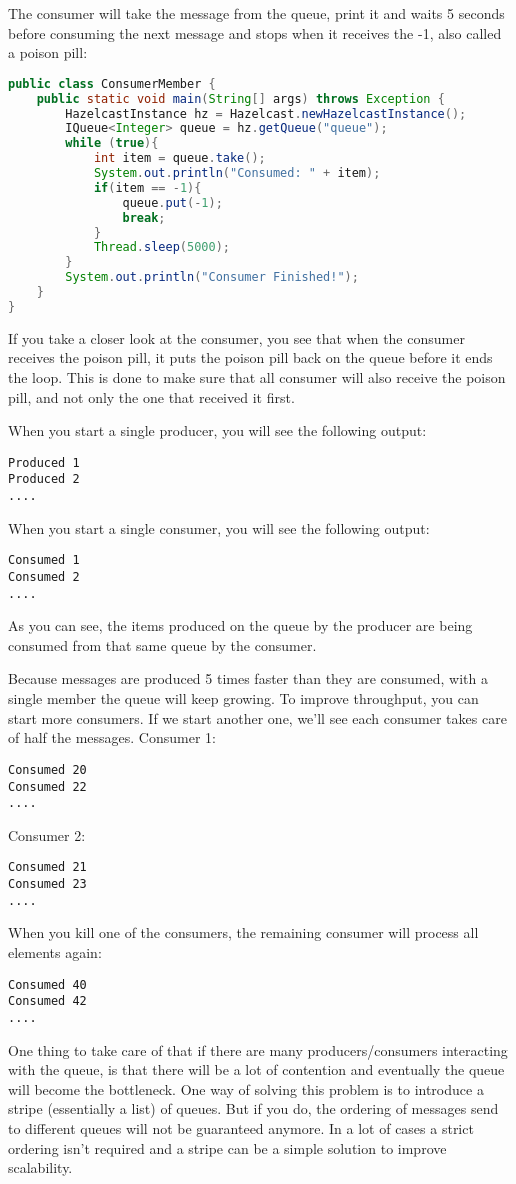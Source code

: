 The consumer will take the message from the queue, print it and waits 5 seconds before consuming the next message and stops when it receives the -1, also called a poison pill:
\begin{lstlisting}[language=java]
public class ConsumerMember {
    public static void main(String[] args) throws Exception {
        HazelcastInstance hz = Hazelcast.newHazelcastInstance();
        IQueue<Integer> queue = hz.getQueue("queue");
        while (true){
            int item = queue.take();
            System.out.println("Consumed: " + item);
            if(item == -1){
                queue.put(-1);
                break;
            }     
            Thread.sleep(5000);
        }
        System.out.println("Consumer Finished!");
    }
}
\end{lstlisting}
If you take a closer look at the consumer, you see that when the consumer receives the poison pill, it puts the poison pill back on the queue before it ends the loop. This is done to make sure that all consumer will also receive the poison pill, and not only the one that received it first.

When you start a single producer, you will see the following output:
\begin{lstlisting}
Produced 1
Produced 2
....
\end{lstlisting}
When you start a single consumer, you will see the following output:
\begin{lstlisting}
Consumed 1
Consumed 2
....
\end{lstlisting}
As you can see, the items produced on the queue by the producer are being consumed from that same queue by the consumer. 

Because messages are produced 5 times faster than they are consumed, with a single member the queue will keep growing. To improve throughput, you can start more consumers. If we start another one, we'll see each consumer takes care of half the messages. Consumer 1:
\begin{lstlisting}
Consumed 20
Consumed 22
....
\end{lstlisting}
Consumer 2:
\begin{lstlisting}
Consumed 21
Consumed 23
....
\end{lstlisting}
When you kill one of the consumers, the remaining consumer will process all elements again:
\begin{lstlisting}
Consumed 40  
Consumed 42 
....
\end{lstlisting}
One thing to take care of that if there are many producers/consumers interacting with the queue, is that there will be a lot of contention and eventually the queue will become the bottleneck. One way of solving this problem is to introduce a stripe (essentially a list) of queues. But if you do, the ordering of messages send to different queues will not be guaranteed anymore. In a lot of cases a strict ordering isn't required and a stripe can be a simple solution to improve scalability.


